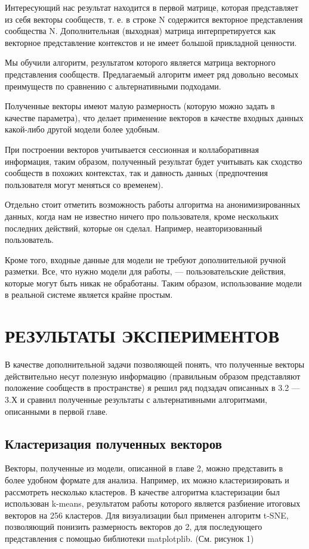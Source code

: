 \documentclass[times,specification,annotation]{itmo-student-thesis}
\begin{document}
Интересующий нас результат находится в первой матрице, которая
представляет из себя векторы сообществ, т. е. в строке N содержится векторное
представления сообщества N. Дополнительная (выходная) матрица
интерпретируется как векторное представление контекстов и не имеет большой
прикладной ценности.

\chapterconclusion

Мы обучили алгоритм, результатом которого является матрица векторного
представления сообществ. Предлагаемый алгоритм имеет ряд довольно весомых
преимуществ по сравнению с альтернативными подходами. 

Полученные векторы
имеют малую размерность (которую можно задать в качестве параметра), что
делает применение векторов в качестве входных данных какой-либо другой
модели более удобным. 

При построении векторов учитывается сессионная и
коллаборативная информация, таким образом, полученный результат будет
учитывать как сходство сообществ в похожих контекстах, так и давность данных
(предпочтения пользователя могут меняться со временем). 

Отдельно стоит отметить возможность работы алгоритма на анонимизированных данных, когда
нам не известно ничего про пользователя, кроме нескольких последних действий,
которые он сделал. Например, неавторизованный пользователь.

Кроме того, входные данные для модели не требуют дополнительной ручной разметки. Все, что нужно модели для работы, --- пользовательские действия, которые могут быть никак не обработаны. Таким образом, использование модели в реальной системе является крайне простым.

\chapter{РЕЗУЛЬТАТЫ ЭКСПЕРИМЕНТОВ}

В качестве дополнительной задачи позволяющей понять, что полученные
векторы действительно несут полезную информацию (правильным образом
представляют положение сообществ в пространстве) я решил ряд подзадач
описанных в 3.2 --- 3.Х и сравнил полученные результаты с альтернативными
алгоритмами, описанными в первой главе.

\section{Кластеризация полученных векторов}

Векторы, полученные из модели, описанной в главе 2, можно представить в
более удобном формате для анализа. Например, их можно кластеризировать и
рассмотреть несколько кластеров. В качестве алгоритма кластеризации был
использован k-means, результатом работы которого является разбиение итоговых
векторов на 256 кластеров. Для визуализации был применен алгоритм t-SNE,
позволяющий понизить размерность векторов до 2, для последующего
представления с помощью библиотеки matplotplib. (См. рисунок 1)
\end{document}
